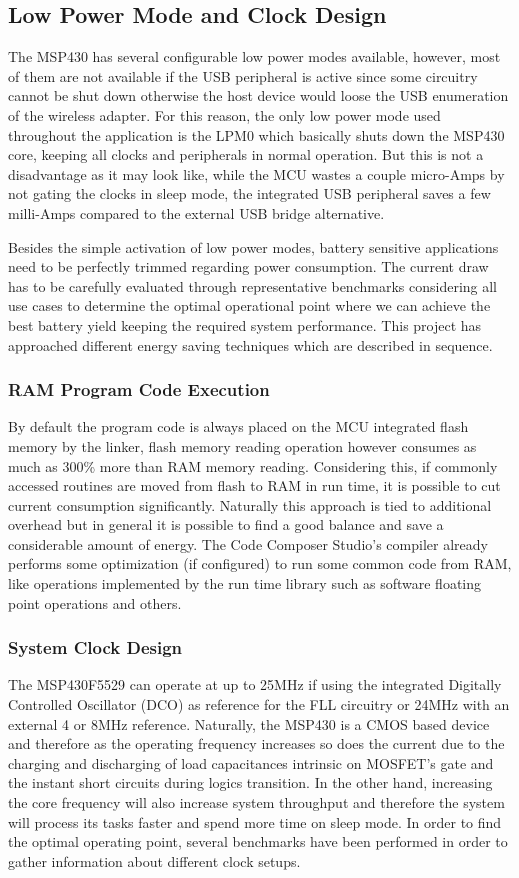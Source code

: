 \documentclass[12pt]{article}
\begin{document}
\subsection{Low Power Mode and Clock Design}
The MSP430 has several configurable low power modes available, however, most of them are not available if the USB peripheral is active since some circuitry cannot be shut down otherwise the host device would loose the USB enumeration of the wireless adapter.
For this reason, the only low power mode used throughout the application is the LPM0 which basically shuts down the MSP430 core, keeping all clocks and peripherals in normal operation. But this is not a disadvantage as it may look like, while the MCU wastes a couple micro-Amps by not gating the clocks in sleep mode, the integrated USB peripheral saves a few milli-Amps compared to the external USB bridge alternative.

Besides the simple activation of low power modes, battery sensitive applications need to be perfectly trimmed regarding power consumption. The current draw has to be carefully evaluated through representative benchmarks considering all use cases to determine the optimal operational point where we can achieve the best battery yield keeping the required system performance. This project has approached different energy saving techniques which are described in sequence.

\subsubsection{RAM Program Code Execution}
By default the program code is always placed on the MCU integrated flash memory by the linker, flash memory reading operation however consumes as much as 300\% more than RAM memory reading. Considering this, if commonly accessed routines are moved from flash to RAM in run time, it is possible to cut current consumption significantly. Naturally this approach is tied to additional overhead but in general it is possible to find a good balance and save a considerable amount of energy. The Code Composer Studio's compiler already performs some optimization (if configured) to run some common code from RAM, like operations implemented by the run time library such as software floating point operations and others.

\subsubsection{System Clock Design}
The MSP430F5529 can operate at up to 25MHz if using the integrated Digitally Controlled Oscillator (DCO) as reference for the FLL circuitry or 24MHz with an external 4 or 8MHz reference. Naturally, the MSP430 is a CMOS based device and therefore as the operating frequency increases so does the current due to the charging and discharging of load capacitances intrinsic on MOSFET's gate and the instant short circuits during logics transition. In the other hand, increasing the core frequency will also increase system throughput and therefore the system will process its tasks faster and spend more time on sleep mode. In order to find the optimal operating point, several benchmarks have been performed in order to gather information about different clock setups.
\end{document}
